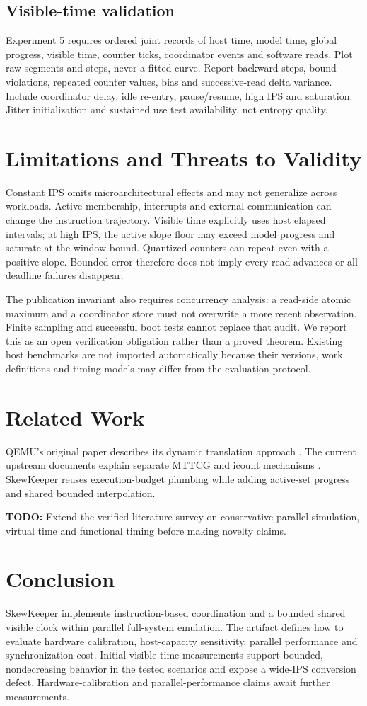 \documentclass[10pt]{article}
\newcommand{\todo}[1]{\par\noindent\textbf{TODO:} #1\par}
\begin{document}
\subsection{Visible-time validation}
Experiment 5 requires ordered joint records of host time, model time, global
progress, visible time, counter ticks, coordinator events and software reads.
Plot raw segments and steps, never a fitted curve. Report backward steps, bound
violations, repeated counter values, bias and successive-read delta variance.
Include coordinator delay, idle re-entry, pause/resume, high IPS and saturation.
Jitter initialization and sustained use test availability, not entropy quality.


\section{Limitations and Threats to Validity}
Constant IPS omits microarchitectural effects and may not generalize across
workloads. Active membership, interrupts and external communication can change
the instruction trajectory. Visible time explicitly uses host elapsed intervals;
at high IPS, the active slope floor may exceed model progress and saturate at
the window bound. Quantized counters can repeat even with a positive slope.
Bounded error therefore does not imply every read advances or all deadline
failures disappear.

The publication invariant also requires concurrency analysis: a read-side atomic
maximum and a coordinator store must not overwrite a more recent observation.
Finite sampling and successful boot tests cannot replace that audit. We report
this as an open verification obligation rather than a proved theorem.
Existing host benchmarks are not imported automatically because their versions,
work definitions and timing models may differ from the evaluation protocol.

\section{Related Work}
QEMU's original paper describes its dynamic translation approach
\cite{bellard2005}. The current upstream documents explain separate MTTCG and
icount mechanisms \cite{qemumttcg,qemuicount}. SkewKeeper reuses execution-budget
plumbing while adding active-set progress and shared bounded interpolation.
\todo{Extend the verified literature survey on conservative parallel simulation,
virtual time and functional timing before making novelty claims.}

\section{Conclusion}
SkewKeeper implements instruction-based coordination and a bounded shared
visible clock within parallel full-system emulation. The artifact defines how
to evaluate hardware calibration, host-capacity sensitivity, parallel performance
and synchronization cost. Initial visible-time measurements support bounded,
nondecreasing behavior in the tested scenarios and expose a wide-IPS conversion
defect. Hardware-calibration and parallel-performance claims await further measurements.



\end{document}

